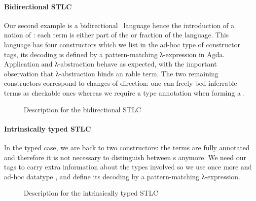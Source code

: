 \paragraph{Bidirectional STLC}\label{par:bidirectional} Our second example is a
bidirectional~\cite{pierce2000local} language hence the introduction of a
notion of : each term is either part of the  or
 fraction of the language. This language has four constructors
which we list in the ad-hoc  type of constructor tags, its
decoding  is defined by a pattern-matching λ-expression in Agda.
Application and λ-abstraction behave as expected, with the important
observation that λ-abstraction binds an rable term. The two
remaining constructors correspond to changes of direction: one can freely
bed inferrable terms as checkable ones whereas we require a type
annotation when forming a .

\begin{figure}[h]
\begin{minipage}{0.4\textwidth}
\end{minipage}\hfill
\begin{minipage}{0.5\textwidth}
\end{minipage}
  \caption{Description for the bidirectional STLC}
\end{figure}

\paragraph{Intrinsically typed STLC}\label{par:intrinsicSTLC} In the typed case, we are back to two
constructors: the terms are fully annotated and therefore it is not necessary
to distinguish between s anymore. We need our tags to carry extra
information about the types involved so we use once more and ad-hoc datatype
, and define its decoding  by a pattern-matching λ-expression.

\begin{figure}[h]
\begin{minipage}{0.4\textwidth}
\end{minipage}\hfill
\begin{minipage}{0.5\textwidth}
\end{minipage}
  \caption{Description for the intrinsically typed STLC}
\end{figure}

